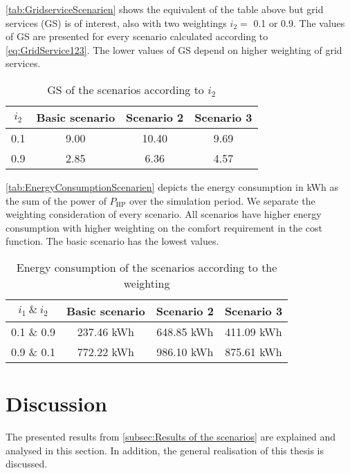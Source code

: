 \autoref{tab:GridserviceScenarien} shows the equivalent of the table above but grid services (GS) is of interest, also with two weightings  $i_\text{2} =$ 0.1 or 0.9. The values of GS are presented for every scenario calculated according to \autoref{eq:GridService123}. The lower values of GS depend on higher weighting of grid services. 
    \begin{table}[H]
        \centering
        \begin{tabular}{c||c|c|c}
          $i_\text{2}$  &  Basic scenario & Scenario 2 & Scenario 3\\
          \hline  \hline
             0.1 & 9.00 & 10.40 & 9.69 \\
             0.9 & 2.85 & 6.36 & 4.57\\
        \end{tabular}
        \caption{GS of the scenarios according to $i_\text{2}$}
        \label{tab:GridserviceScenarien}
    \end{table}
    
\autoref{tab:EnergyConsumptionScenarien} depicts the energy consumption in kWh as the sum of the power of $P_\text{HP}$ over the simulation period. We separate the weighting consideration of every scenario. All scenarios have higher energy consumption with higher weighting on the comfort requirement in the cost function. The basic scenario has the lowest values. 
    \begin{table}[H]
        \centering
        \begin{tabular}{c||c|c|c}
          $i_\text{1} \ \& \  i_\text{2}$  &  Basic scenario & Scenario 2 & Scenario 3\\
          \hline  \hline
             0.1 \& 0.9 & 237.46 kWh & 648.85 kWh & 411.09 kWh\\
             0.9 \& 0.1 & 772.22 kWh & 986.10 kWh & 875.61 kWh\\
        \end{tabular}
        \caption{Energy consumption of the scenarios according to the weighting}
        \label{tab:EnergyConsumptionScenarien}
    \end{table}

\section{Discussion}
\label{sec:discussion}
The presented results from \autoref{subsec:Results of the scenarios} are explained and analysed in this section. In addition, the general realisation of this thesis is discussed.

